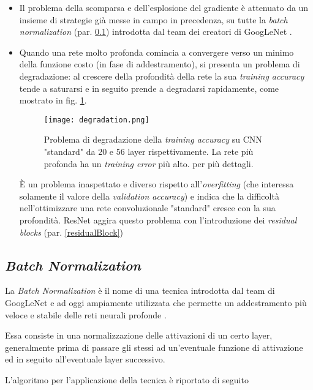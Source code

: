 \begin{itemize}

\item Il problema della scomparsa e dell'esplosione del gradiente è attenuato da un insieme di strategie già messe in campo in precedenza, su tutte la \textit{batch normalization} (par. \ref{batchNormalization}) introdotta dal team dei creatori di GoogLeNet \cite{batchNorm}.

\item Quando una rete molto profonda comincia a convergere verso un minimo della funzione costo (in fase di addestramento), si presenta un problema di degradazione: al crescere della profondità della rete la sua \textit{training accuracy} tende a saturarsi e in seguito prende a degradarsi rapidamente, come mostrato in fig. \ref{fig:degradation}.

\begin{figure}[h!]
\centering
\texttt{[image: degradation.png]}
\caption{Problema di degradazione della \textit{training accuracy} su CNN "standard" da 20 e 56 layer rispettivamente. La rete più profonda ha un \textit{training error} più alto. \cite{resnet} per più dettagli.}
\label{fig:degradation}
\end{figure}

È un problema inaspettato e diverso rispetto all'\textit{overfitting} (che interessa solamente il valore della \textit{validation accuracy}) e indica che la difficoltà nell'ottimizzare una rete convoluzionale "standard" cresce con la sua profondità. ResNet aggira questo problema con l'introduzione dei \textit{residual blocks} (par. \ref{residualBlock})

\end{itemize}

\subsection{\textit{Batch Normalization}}
\label{batchNormalization}
La \textit{Batch Normalization} è il nome di una tecnica introdotta dal team di GoogLeNet e ad oggi ampiamente utilizzata che permette un addestramento più veloce e stabile delle reti neurali profonde \cite{batchNorm}.

Essa consiste in una normalizzazione delle attivazioni di un certo layer, generalmente prima di passare gli stessi ad un'eventuale funzione di attivazione ed in seguito all'eventuale layer successivo.

L'algoritmo per l'applicazione della tecnica è riportato di seguito\\

